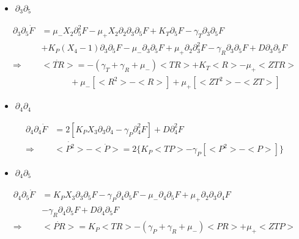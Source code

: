 \documentclass{article}
\begin{document}
\begin{itemize}
    \item $\partial_3\partial_5$
\end{itemize}
\begin{align*}
    \partial_3\partial_5\Dot{F} &= \mu_-X_2\partial_5^2F - \mu_+X_2\partial_2\partial_3\partial_5F + K_T\partial_5F - \gamma_T\partial_3\partial_5F\\
                                & + K_P(X_4-1)\partial_3\partial_5F - \mu_-\partial_3\partial_5F + \mu_+\partial_2\partial_3^2F - \gamma_R\partial_3\partial_5F + D\partial_3\partial_5F\\
                \Longrightarrow & <\Dot{TR}> = -(\gamma_T + \gamma_R + \mu_-)<TR> + K_T<R> - \mu_+<ZTR>\\
                                & \hspace{40pt} + \mu_-[<R^2>-<R>] + \mu_+[<ZT^2>-<ZT>]
\end{align*}

\begin{itemize}
    \item $\partial_4\partial_4$
\end{itemize}
\begin{align*}
    \partial_4\partial_4\Dot{F} &= 2[K_PX_3\partial_3\partial_4 - \gamma_P\partial_4^2F] + D\partial_4^2F\\
    \Longrightarrow & <\Dot{P^2}>-<\Dot{P}> = 2\{K_P<TP> - \gamma_P[<P^2>-<P>]\}
\end{align*}

\begin{itemize}
    \item $\partial_4\partial_5$
\end{itemize}
\begin{align*}
    \partial_4\partial_5\Dot{F} &= K_PX_3\partial_3\partial_5F - \gamma_P\partial_4\partial_5F - \mu_-\partial_4\partial_5F + \mu_+\partial_2\partial_3\partial_4F\\
                                &- \gamma_R\partial_4\partial_5F + D\partial_4\partial_5F\\
                \Longrightarrow & <\Dot{PR}> = K_P<TR> - (\gamma_P + \gamma_R+\mu_-)<PR> + \mu_+<ZTP>
\end{align*}
\end{document}
